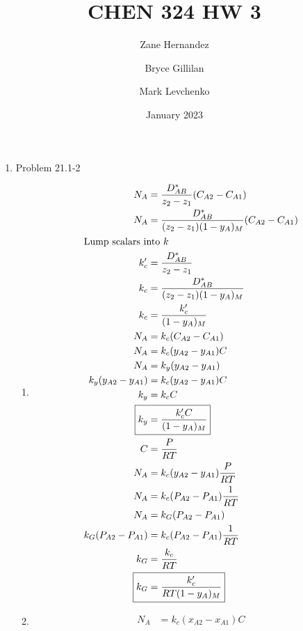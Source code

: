 \documentclass[12pt]{article}
\title{CHEN 324 HW 3}
\author[1]{Zane Hernandez}
\author[2]{Bryce Gillilan}
\author[3]{Mark Levchenko}
\affil[1,2,3]{Group 11}
\date{January 2023}
\begin{document}
\maketitle

\begin{enumerate}

\newpage
    \item Problem 21.1-2
    \begin{enumerate}
        \item 
        \begin{align*}
            N_A &= \frac{D_{AB}^*}{z_2 - z_1} (C_{A2} - C_{A1}) \\
            N_A &= \frac{D_{AB}^*}{(z_2 - z_1)(1 - y_A)_M} (C_{A2} - C_{A1}) \\
            \intertext{Lump scalars into $k$}
            k'_c &= \frac{D_{AB}^*}{z_2 - z_1} \\
            k_c &= \frac{D_{AB}^*}{(z_2 - z_1)(1 - y_A)_M} \\
            k_c &= \frac{k'_c}{(1 - y_A)_M} \\
            N_A &= k_c (C_{A2} - C_{A1}) \\
            N_A &= k_c (y_{A2} - y_{A1}) C \\
            N_A &= k_y (y_{A2} - y_{A1}) \\
            k_y (y_{A2} - y_{A1}) &= k_c (y_{A2} - y_{A1}) C \\
            k_y &= k_c C \\
            \Aboxed{k_y &= \frac{k'_c C}{(1 - y_A)_M}} \\
            C &= \frac{P}{RT} \\
            N_A &= k_c (y_{A2} - y_{A1}) \frac{P}{RT} \\
            N_A &= k_c (P_{A2} - P_{A1}) \frac{1}{RT} \\
            N_A &= k_G (P_{A2} - P_{A1}) \\
            k_G (P_{A2} - P_{A1}) &= k_c (P_{A2} - P_{A1}) \frac{1}{RT} \\
            k_G &= \frac{k_c}{RT} \\
            \Aboxed{k_G &= \frac{k'_c}{RT (1 - y_A)_M}} \\
        \end{align*}
        \item
        \begin{align*}
            N_A &= k_c (x_{A2} - x_{A1}) C \\

\end{align*}
\end{enumerate}
\end{enumerate}
\end{document}
